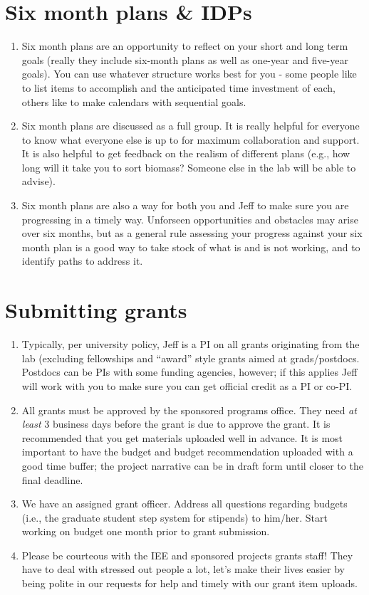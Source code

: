 \documentclass[12pt]{article}
\begin{document}
\section{Six month plans & IDPs}
\begin{enumerate}
\item Six month plans are an opportunity to reflect on your short and long term goals (really they include six-month plans as well as one-year and five-year goals). You can use whatever structure works best for you - some people like to list items to accomplish and the anticipated time investment of each, others like to make calendars with sequential goals. 
\item Six month plans are discussed as a full group. It is really helpful for everyone to know what everyone else is up to for maximum collaboration and support. It is also helpful to get feedback on the realism of different plans (e.g., how long will it take you to sort biomass? Someone else in the lab will be able to advise). 
\item Six month plans are also a way for both you and Jeff to make sure you are progressing in a timely way. Unforseen opportunities and obstacles may arise over six months, but as a general rule assessing your progress against your six month plan is a good way to take stock of what is and is not working, and to identify paths to address it.
\end{enumerate}


\section{Submitting grants}
\begin{enumerate}
\item Typically, per university policy, Jeff is a PI on all grants originating from
  the lab (excluding fellowships and ``award'' style grants aimed at grads/postdocs. Postdocs can be PIs with some funding agencies, however; if this applies Jeff will work with you to make sure you can get official credit as a PI or co-PI.
\item All grants must be approved by the sponsored programs office. They need \textit{at least} 3 business days before the grant is due to approve the grant. It is recommended that you get materials uploaded well in advance. It is most important to have the budget and budget recommendation uploaded with a good time buffer; the project narrative can be in draft form until closer to the final deadline.  
\item We have an assigned grant officer.  Address all questions regarding budgets (i.e., the graduate student step system for stipends) to him/her. Start working on budget one month prior to grant submission.
\item Please be courteous with the IEE and sponsored projects grants staff! They have to deal with stressed out people a lot, let's make their lives easier by being polite in our requests for help and timely with our grant item uploads.
\end{enumerate}
\end{document}
